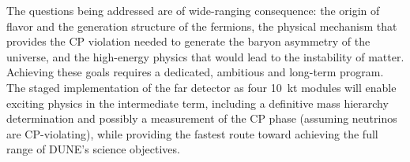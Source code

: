 The questions being addressed are of wide-ranging consequence: the origin of flavor and the generation
structure of the fermions, the physical mechanism that provides the CP
violation needed to generate the baryon asymmetry of the universe, 
and the high-energy physics that would lead to the instability
of matter.  Achieving these goals requires a dedicated, ambitious and
long-term program.  
The staged implementation of
the far detector as four 10~kt modules will enable
exciting physics in the intermediate term, including a definitive mass
hierarchy determination and possibly a measurement of the CP phase 
(assuming neutrinos are CP-violating),  
while providing the fastest route toward achieving the
full range of DUNE's science objectives.  




